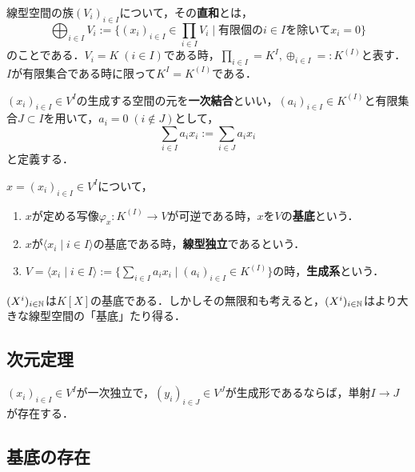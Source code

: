 \documentclass[uplatex, 12pt, dvipdfmx]{jsreport}
\begin{document}
\begin{definition}[任意個の線型空間の直和]
    線型空間の族$(V_i)_{i\in I}$について，その\textbf{直和}とは，
    \[ \bigoplus_{i\in I}V_i:=\{(x_i)_{i\in I}\in\prod_{i\in I}V_i\mid 有限個のi\in Iを除いてx_i=0\} \]
    のことである．$V_i=K\;(i\in I)$である時，$\prod_{i\in I}=K^I, \oplus_{i\in I}=:K^{(I)}$と表す．$I$が有限集合である時に限って$K^I=K^{(I)}$である．
\end{definition}

\begin{definition}[任意個の一次結合]
    $(x_i)_{i\in I}\in V^I$の生成する空間の元を\textbf{一次結合}といい，$(a_i)_{i\in I}\in K^{(I)}$と有限集合$J\subset I$を用いて，$a_i=0\;(i\notin J)$として，
    \[ \sum_{i\in I}a_ix_i:=\sum_{i\in J}a_ix_i \]
    と定義する．
\end{definition}

\begin{definition}
    $x=(x_i)_{i\in I}\in V^I$について，
    \begin{enumerate}
        \item $x$が定める写像$\varphi_x:K^{(I)}\to V$が可逆である時，$x$を$V$の\textbf{基底}という．
        \item $x$が$\langle x_i\mid i\in I\rangle$の基底である時，\textbf{線型独立}であるという．
        \item $V=\langle x_i\mid i\in I\rangle:=\{\sum_{i\in I}a_ix_i\mid (a_i)_{i\in I}\in K^{(I)}\}$の時，\textbf{生成系}という．
    \end{enumerate}
\end{definition}

\begin{example}
    $(X^i)_{i\in\mathbb{N}}$は$K[X]$の基底である．しかしその無限和も考えると，$(X^i)_{i\in\mathbb{N}}$はより大きな線型空間の「基底」たり得る．
\end{example}

\subsection{次元定理}

\begin{theorem}
    $(x_i)_{i\in I}\in V^I$が一次独立で，$(y_i)_{i\in J}\in V^J$が生成形であるならば，単射$I\to J$が存在する．
\end{theorem}

\subsection{基底の存在}
\end{document}
